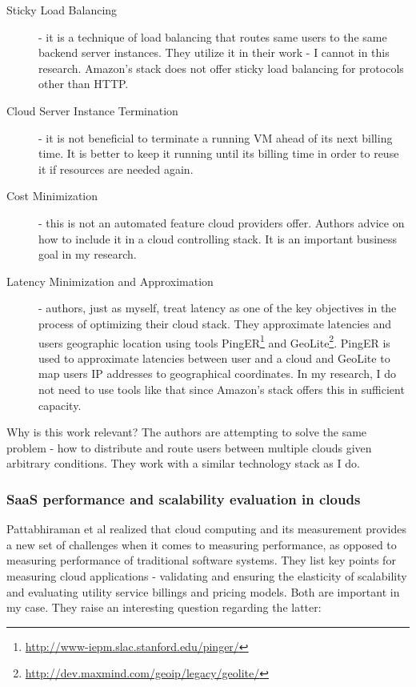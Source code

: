 \documentclass{uvamscse}
\begin{document}
\begin{description}
  \item[Sticky Load Balancing] - it is a technique of load balancing that routes same users to the same backend server instances. They utilize it in their work - I cannot in this research. Amazon's stack does not offer sticky load balancing for protocols other than HTTP.
  \item[Cloud Server Instance Termination] - it is not beneficial to terminate a running VM ahead of its next billing time. It is better to keep it running until its billing time in order to reuse it if resources are needed again.
  \item[Cost Minimization] - this is not an automated feature cloud providers offer. Authors advice on how to include it in a cloud controlling stack. It is an important business goal in my research.
  \item[Latency Minimization and Approximation] - authors, just as myself, treat latency as one of the key objectives in the process of optimizing their cloud stack. They approximate latencies and users geographic location using tools PingER\footnote{\url{http://www-iepm.slac.stanford.edu/pinger/}} and GeoLite\footnote{\url{http://dev.maxmind.com/geoip/legacy/geolite/}}. PingER is used to approximate latencies between user and a cloud and GeoLite to map users IP addresses to geographical coordinates. In my research, I do not need to use tools like that since Amazon's stack offers this in sufficient capacity.
\end{description}

Why is this work relevant? The authors are attempting to solve the same problem - how to distribute and route users between multiple clouds given arbitrary conditions. They work with a similar technology stack as I do.

\subsubsection{SaaS performance and scalability evaluation in clouds}

Pattabhiraman et al realized that cloud computing and its measurement provides a new set of challenges when it comes to measuring performance, as opposed to measuring performance of traditional software systems. They list key points for measuring cloud applications - validating and ensuring the elasticity of scalability and evaluating utility service billings and pricing models. Both are important in my case. They raise an interesting question regarding the latter:
\end{document}
